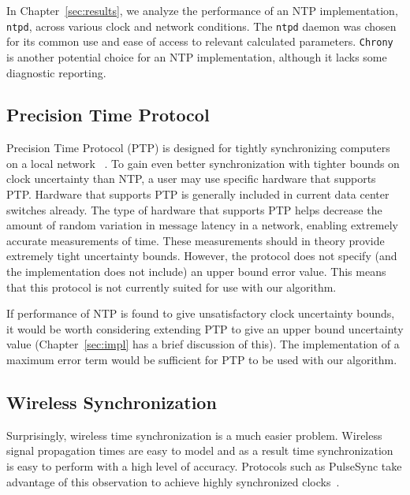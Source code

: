 In Chapter~\ref{sec:results}, we analyze the
performance of an NTP implementation, \texttt{ntpd}, across various clock and
network conditions. The \texttt{ntpd} daemon was chosen for its common use and
ease of access to relevant calculated parameters. \texttt{Chrony} is another
potential choice for an NTP implementation, although it lacks some
diagnostic reporting. %

\subsection{Precision Time Protocol}

Precision Time Protocol (PTP) is designed for 
tightly synchronizing computers on a local network
~\citeyearpar{2008}. To gain even better 
synchronization with tighter bounds on clock uncertainty than NTP, 
a user may use specific hardware that supports PTP. Hardware that supports
PTP is generally included in current data center switches already. The type
of hardware that supports PTP helps decrease the amount of random variation in
message latency in a network, enabling extremely accurate measurements of time.
These measurements should in theory provide extremely tight uncertainty
bounds. However, the protocol does not specify (and the implementation
does not include) an upper bound error value. This means that this
protocol is not currently suited for use with our algorithm.

If performance of NTP is found to give unsatisfactory clock uncertainty bounds,
it would be worth considering extending PTP to give an upper bound uncertainty
value (Chapter~\ref{sec:impl} 
has a brief discussion of this). The implementation of a maximum error term 
would be sufficient for PTP to be used with our algorithm. 


\subsection{Wireless Synchronization}

Surprisingly, wireless time synchronization is a much easier
problem. Wireless signal propagation times are easy to model and
as a result time synchronization is easy to perform with a high
level of accuracy. Protocols such as PulseSync take advantage of this
observation to achieve highly synchronized clocks~\citep{Lenzen2010}.

